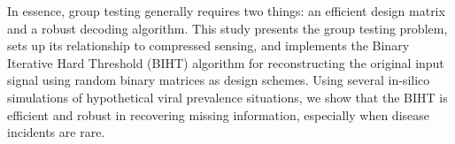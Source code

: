 In essence, group  testing generally requires two things: an efficient design matrix and a robust decoding algorithm. This study presents the group testing problem, sets up its relationship to compressed sensing, and implements the Binary Iterative Hard Threshold (BIHT) algorithm for reconstructing the original input signal using random binary matrices as design schemes. Using several in-silico simulations of hypothetical viral prevalence situations, we show that the BIHT is efficient and robust in recovering missing information, especially when disease incidents are rare.